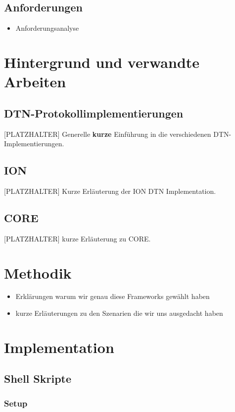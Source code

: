 \documentclass{article}
\begin{document}
\subsection{Anforderungen}

\begin{itemize}
\item Anforderungsanalyse
\end{itemize}

\section{Hintergrund und verwandte Arbeiten}

\subsection{DTN-Protokollimplementierungen}
[PLATZHALTER] Generelle \textbf{kurze} Einführung in die verschiedenen DTN-Implementierungen. 
\subsection{ION}
[PLATZHALTER] Kurze Erläuterung der ION DTN Implementation.
\subsection{CORE}
[PLATZHALTER] kurze Erläuterung zu CORE.\par

\section{Methodik}

\begin{itemize}
\item Erklärungen warum wir genau diese Frameworks gewählt haben
\item kurze Erläuterungen zu den Szenarien die wir uns ausgedacht haben
\end{itemize}

\section{Implementation}

\subsection{Shell Skripte}
\subsubsection{Setup}
\end{document}
